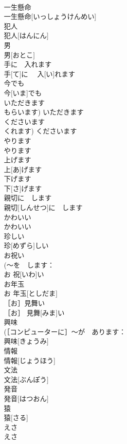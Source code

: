 \documentclass[8pt]{extreport}
\begin{document}
\begin{CJK}{UTF8}{min}
\\	一生懸命	
\\	一生懸命[いっしょうけんめい]	
\\	犯人	
\\	犯人[はんにん]	
\\	男	
\\	男[おとこ]	
\\	手に　入れます	
\\	手[て]に　 入[い]れます	
\\	今でも	
\\	今[いま]でも	
\\	いただきます	
\\	もらいます)	いただきます	
\\	くださいます	
\\	くれます)	くださいます	
\\	やります	
\\	やります	
\\	上げます	
\\	上[あ]げます	
\\	下げます	
\\	下[さ]げます	
\\	親切に　します	
\\	親切[しんせつ]に　します	
\\	かわいい	
\\	かわいい	
\\	珍しい	
\\	珍[めずら]しい	
\\	お祝い	
\\	(〜を　します：
\\	お 祝[いわ]い	
\\	お年玉	
\\	お 年玉[としだま]	
\\	［お］見舞い	
\\	［お］ 見舞[みま]い	
\\	興味	
\\	(［コンピューターに］〜が　あります：
\\	興味[きょうみ]	
\\	情報	
\\	情報[じょうほう]	
\\	文法	
\\	文法[ぶんぽう]	
\\	発音	
\\	発音[はつおん]	
\\	猿	
\\	猿[さる]	
\\	えさ	
\\	えさ	

\end{CJK}
\end{document}

